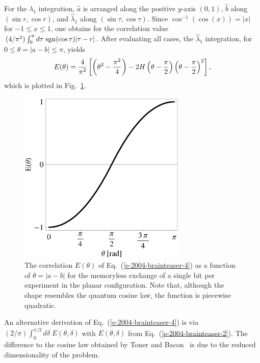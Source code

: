 \documentclass[prl,preprint,amsfonts,showpacs,showkeys]{revtex4}
\begin{document}
For the ${\lambda}_1$ integration,
${\hat a}$ is arranged along the positive $y$-axis $(0,1)$,
${\hat b}$ along $(\sin r,\cos r)$, and
${\hat \lambda}_1$ along $(\sin \tau ,\cos \tau )$.
Since $\cos^{-1} (\cos (x))=\vert x\vert$ for $-1\le x\le 1$,
one obtains for the correlation value
$(4/\pi^2)\int_0^\pi d \tau \;{\rm sgn}(\cos \tau ) \vert \tau -r\vert$.
After evaluating all cases, the ${\hat \lambda}_1$ integration,
for $0\le \theta =\vert{ a}- { b}\vert \le \pi $, yields
\begin{equation}
E(\theta ) =
{4\over \pi^2}
\left[
\left(\theta ^2 -{\pi^2 \over 4}\right)
-2
H\left(\theta -{\pi \over 2}\right)
\left(\theta -{\pi \over 2} \right)^2
\right],
\label{e-2004-brainteaser-4}
\end{equation}
which is plotted in Fig.~\ref{2004-brainteaser-f3}.
\begin{figure}[htbp]
  \centering
 \includegraphics[width=80mm]{2004-brainteaser-f3}
  \caption{The correlation $E(\theta )$ of Eq.~(\ref{e-2004-brainteaser-4}) as a function of
$\theta =\vert{ a}- { b}\vert$ for the memoryless exchange of a single
bit per experiment in the planar configuration.
Note that, although the shape resembles the quantum cosine law,
the function is piecewise quadratic.}
  \label{2004-brainteaser-f3}
\end{figure}
An alternative derivation of Eq.~(\ref{e-2004-brainteaser-4}) is via
$(2/\pi )\int_0^{\pi /2} d\delta \; E(\theta,\delta )$ with $E(\theta,\delta )$
from Eq.~(\ref{e-2004-brainteaser-2}).
The difference to the cosine law obtained by Toner and Bacon~\cite{toner-bacon-03}
is due to the reduced dimensionality of the problem.

\end{document}
